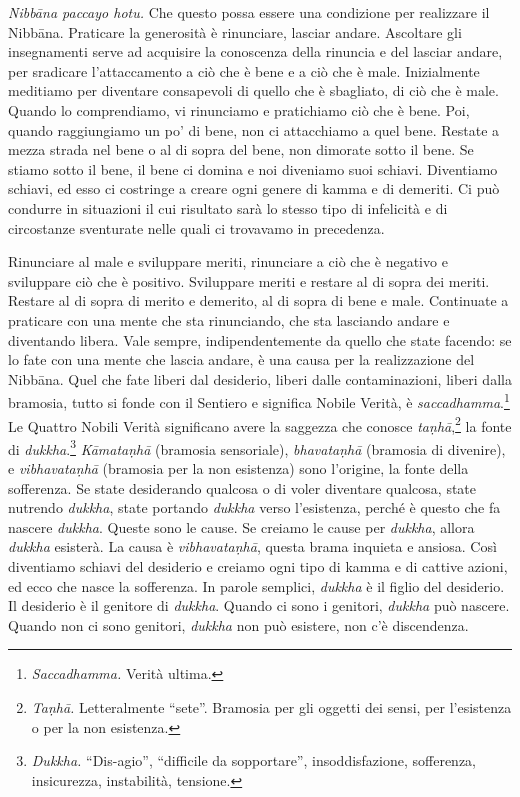 \emph{Nibbāna paccayo hotu.} Che questo possa essere una condizione per
realizzare il Nibbāna. Praticare la generosità è rinunciare,
lasciar andare. Ascoltare gli insegnamenti serve ad acquisire la
conoscenza della rinuncia e del lasciar andare, per sradicare
l'attaccamento a ciò che è bene e a ciò che è male. Inizialmente
meditiamo per diventare consapevoli di quello che è sbagliato, di ciò
che è male. Quando lo comprendiamo, vi rinunciamo e pratichiamo ciò che
è bene. Poi, quando raggiungiamo un po' di bene, non ci attacchiamo a
quel bene. Restate a mezza strada nel bene o al di sopra del bene, non
dimorate sotto il bene. Se stiamo sotto il bene, il bene ci domina e noi
diveniamo suoi schiavi. Diventiamo schiavi, ed esso ci costringe a
creare ogni genere di kamma e di demeriti. Ci può condurre in
situazioni il cui risultato sarà lo stesso tipo di infelicità e di
circostanze sventurate nelle quali ci trovavamo in precedenza.

Rinunciare al male e sviluppare meriti, rinunciare a ciò che è negativo
e sviluppare ciò che è positivo. Sviluppare meriti e restare al di sopra
dei meriti. Restare al di sopra di merito e demerito, al di sopra di
bene e male. Continuate a praticare con una mente che sta rinunciando,
che sta lasciando andare e diventando libera. Vale sempre,
indipendentemente da quello che state facendo: se lo fate con una mente
che lascia andare, è una causa per la realizzazione del Nibbāna.
Quel che fate liberi dal desiderio, liberi dalle contaminazioni, liberi
dalla bramosia, tutto si fonde con il Sentiero e significa Nobile
Verità, è \emph{saccadhamma}.\footnote{\emph{Saccadhamma.} Verità
  ultima.} Le Quattro Nobili Verità significano avere la saggezza che
conosce \emph{taṇhā},\footnote{\emph{Taṇhā.} Letteralmente ``sete''.
  Bramosia per gli oggetti dei sensi, per l'esistenza o per la non
  esistenza.} la fonte di \emph{dukkha}.\footnote{\emph{Dukkha.}
  ``Dis-agio'', ``difficile da sopportare'', insoddisfazione,
  sofferenza, insicurezza, instabilità, tensione.}
\emph{Kāmataṇhā} (bramosia sensoriale),
\emph{bhavataṇhā} (bramosia di divenire),
e \emph{vibhavataṇhā} (bramosia per la non esistenza) sono
l'origine, la fonte della sofferenza. Se state desiderando qualcosa o di
voler diventare qualcosa, state nutrendo \emph{dukkha}, state portando
\emph{dukkha} verso l'esistenza, perché è questo che fa nascere
\emph{dukkha}. Queste sono le cause. Se creiamo le cause per
\emph{dukkha}, allora \emph{dukkha} esisterà. La causa è
\emph{vibhavataṇhā}, questa brama inquieta e ansiosa. Così diventiamo
schiavi del desiderio e creiamo ogni tipo di kamma e di cattive
azioni, ed ecco che nasce la sofferenza. In parole semplici,
\emph{dukkha} è il figlio del desiderio. Il desiderio è il genitore di
\emph{dukkha}. Quando ci sono i genitori, \emph{dukkha} può nascere.
Quando non ci sono genitori, \emph{dukkha} non può esistere, non c'è
discendenza.


